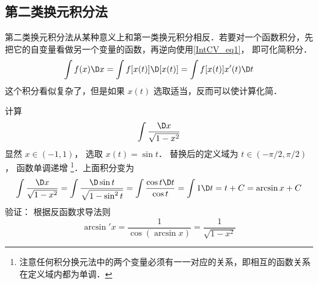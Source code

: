 \subsection{第二类换元积分法}
第二类换元积分法从某种意义上和第一类换元积分相反．若要对一个函数积分，先把它的自变量看做另一个变量的函数，再逆向使用\autoref{IntCV_eq1}， 即可化简积分．
\begin{equation}\label{IntCV_eq6}
\int f(x)\D x = \int f[x(t)]\D [x(t)] = \int f[x(t)]x'(t)\D t
\end{equation}
这个积分看似复杂了，但是如果 $x\left( t \right)$ 选取适当，反而可以使计算化简．

\begin{exam}{}
计算
\[\int \frac{\D x}{\sqrt{1-x^2}}\]
显然 $x \in \left( { - 1,1} \right)$， 选取 $x(t)=\sin t$． 替换后的定义域为 $t \in ( -\pi/2,\pi/2)$， 函数单调递增 \footnote{注意任何积分换元法中的两个变量必须有一一对应的关系，即相互的函数关系在定义域内都为单调．}．上面积分变为
\begin{equation}
\int \frac{\D x}{\sqrt{1-x^2}}  = \int \frac{\D\sin t}{\sqrt{1-\sin^2 t}} = \int \frac{\cos t\D t}{\cos t}  = \int {1\D t}  = t + C = \arcsin x + C
\end{equation}
验证： 根据反函数求导法则
\begin{equation}
\arcsin'x = \frac{1}{{\cos \left( {\arcsin x} \right)}} = \frac{1}{{\sqrt {1 - {x^2}} }}
\end{equation}
\end{exam}




